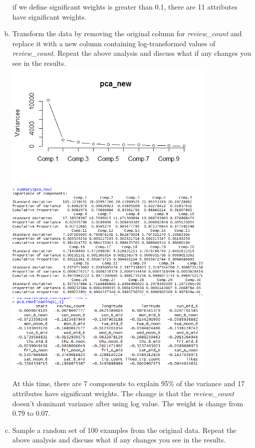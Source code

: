 \documentclass[11pt]{article}
\begin{document}
\begin{enumerate}[(a)]
if we define significant weights is greater than 0.1, there are 11 attributes have significant weights.
\item Transform the data by removing the original column for {\em review\_count} and replace it with a new column containing log-transformed values of {\em review\_count}. Repeat the above analysis and discuss what if any changes you see in the results. \\
\includegraphics[width=4in]{pca_new.png}\\ 
\includegraphics[width=4in]{pca_new_result.png}\\
\includegraphics[width=4in]{b.png}\\
\\At this time, there are 7 components to explain 95\% of the variance and 17 attributes have significant weights. The change is that the {\em review\_count} doesn't dominant variance after using log value. The weight is change from 0.79 to 0.07. 
\item Sample a random set of 100 examples from the original data. Repeat the above analysis and discuss what if any changes you see in the results.

\end{enumerate}
\end{document}
